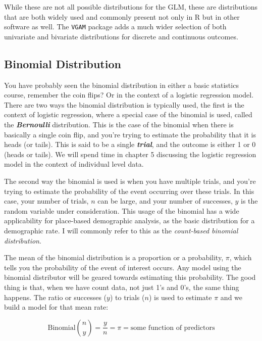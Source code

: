 \documentclass[
  letterpaper,
  DIV=11,
  numbers=noendperiod]{scrreprt}
\begin{document}
While these are not all possible distributions for the GLM, these are
distributions that are both widely used and commonly present not only in
R but in other software as well. The \texttt{VGAM} package adds a much
wider selection of both univariate and bivariate distributions for
discrete and continuous outcomes.

\hypertarget{binomial-distribution}{%
\subsection{Binomial Distribution}\label{binomial-distribution}}

You have probably seen the binomial distribution in either a basic
statistics course, remember the coin flips? Or in the context of a
logistic regression model. There are two ways the binomial distribution
is typically used, the first is the context of logistic regression,
where a special case of the binomial is used, called the
\textbf{\emph{Bernoulli}} distribution. This is the case of the binomial
when there is basically a single coin flip, and you're trying to
estimate the probability that it is heads (or tails). This is said to be
a single \textbf{\emph{trial}}, and the outcome is either 1 or 0 (heads
or tails). We will spend time in chapter 5 discussing the logistic
regression model in the context of individual level data.

The second way the binomial is used is when you have multiple trials,
and you're trying to estimate the probability of the event occurring
over these trials. In this case, your number of trials, \(n\) can be
large, and your number of successes, \(y\) is the random variable under
consideration. This usage of the binomial has a wide applicability for
place-based demographic analysis, as the basic distribution for a
demographic rate. I will commonly refer to this as the \emph{count-based
binomial distribution}.

The mean of the binomial distribution is a proportion or a probability,
\(\pi\), which tells you the probability of the event of interest
occurs. Any model using the binomial distributor will be geared towards
estimating this probability. The good thing is that, when we have count
data, not just 1's and 0's, the same thing happens. The ratio or
successes (\(y\)) to trials (\(n\)) is used to estimate \(\pi\) and we
build a model for that mean rate:

\[\text{Binomial} \binom{n}{y} = \frac{y}{n} = \pi = \text{some function of predictors}\]
\end{document}
